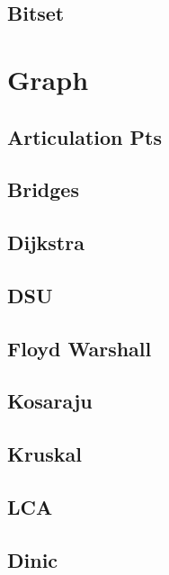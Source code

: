 \subsection{Bitset}
\raggedbottom
\hrulefill

\section{Graph}
\subsection{Articulation Pts}
\raggedbottom
\hrulefill
\subsection{Bridges}
\raggedbottom
\hrulefill
\subsection{Dijkstra}
\raggedbottom
\hrulefill
\subsection{DSU}
\raggedbottom
\hrulefill
\subsection{Floyd Warshall}
\raggedbottom
\hrulefill
\subsection{Kosaraju}
\raggedbottom
\hrulefill
\subsection{Kruskal}
\raggedbottom
\hrulefill
\subsection{LCA}
\raggedbottom
\hrulefill
\subsection{Dinic}
\raggedbottom
\hrulefill

